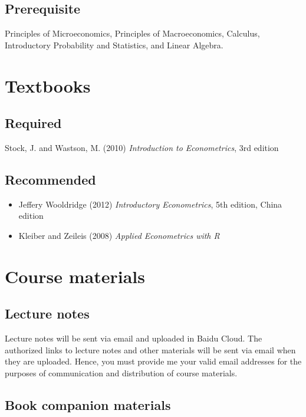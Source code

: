 \documentclass[a4paper,11pt]{article}
\begin{document}
\subsection*{Prerequisite}
\label{sec:org1519452}

Principles of Microeconomics, Principles of Macroeconomics, Calculus,
Introductory Probability and Statistics, and Linear Algebra.


\section{Textbooks}
\label{sec:org85e50b6}
\subsection*{Required}
\label{sec:orgf23f516}

Stock, J. and Wastson, M. (2010) \emph{Introduction to Econometrics}, 3rd
edition

\subsection*{Recommended}
\label{sec:org6a6a29a}

\begin{itemize}
\item Jeffery Wooldridge (2012) \emph{Introductory Econometrics}, 5th edition, China edition

\item Kleiber and Zeileis (2008) \emph{Applied Econometrics with R}
\end{itemize}


\section{Course materials}
\label{sec:org10fe291}
\subsection*{Lecture notes}
\label{sec:orgb718057}

Lecture notes will be sent via email and uploaded in Baidu Cloud. The
authorized links to lecture notes and other materials will be sent via
email when they are uploaded. Hence, you must provide me your valid
email addresses for the purposes of communication and distribution of
course materials.

\subsection*{Book companion materials}
\label{sec:orgf21ca4d}
\end{document}
